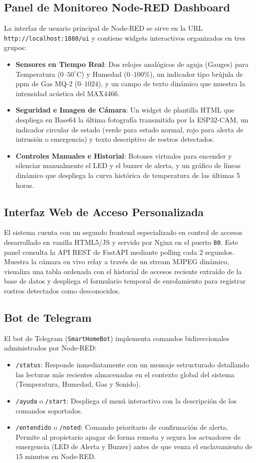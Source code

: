 \documentclass[12pt,letterpaper]{article}
\begin{document}
\subsection{Panel de Monitoreo Node-RED Dashboard}
La interfaz de usuario principal de Node-RED se sirve en la URL \texttt{http://localhost:1880/ui} y contiene widgets interactivos organizados en tres grupos:
\begin{itemize}
    \item \textbf{Sensores en Tiempo Real}: Dos relojes analógicos de aguja (Gauges) para Temperatura ($0\text{--}50^{\circ}\text{C}$) y Humedad ($0\text{--}100\%$), un indicador tipo brújula de ppm de Gas MQ-2 ($0\text{--}1024$), y un campo de texto dinámico que muestra la intensidad acústica del MAX4466.
    \item \textbf{Seguridad e Imagen de Cámara}: Un widget de plantilla HTML que despliega en Base64 la última fotografía transmitida por la ESP32-CAM, un indicador circular de estado (verde para estado normal, rojo para alerta de intrusión o emergencia) y texto descriptivo de rostros detectados.
    \item \textbf{Controles Manuales e Historial}: Botones virtuales para encender y silenciar manualmente el LED y el buzzer de alerta, y un gráfico de líneas dinámico que despliega la curva histórica de temperatura de las últimas 5 horas.
\end{itemize}

\subsection{Interfaz Web de Acceso Personalizada}
El sistema cuenta con un segundo frontend especializado en control de accesos desarrollado en vanilla HTML5/JS y servido por Nginx en el puerto \texttt{80}. Este panel consulta la API REST de FastAPI mediante polling cada 2 segundos. Muestra la cámara en vivo relay a través de un stream MJPEG dinámico, visualiza una tabla ordenada con el historial de accesos reciente extraído de la base de datos y despliega el formulario temporal de enrolamiento para registrar rostros detectados como desconocidos.

\subsection{Bot de Telegram}
El bot de Telegram (\texttt{SmartHomeBot}) implementa comandos bidireccionales administrados por Node-RED:
\begin{itemize}
    \item \texttt{/status}: Responde inmediatamente con un mensaje estructurado detallando las lecturas más recientes almacenadas en el contexto global del sistema (Temperatura, Humedad, Gas y Sonido).
    \item \texttt{/ayuda} o \texttt{/start}: Despliega el menú interactivo con la descripción de los comandos soportados.
    \item \texttt{/entendido} o \texttt{/noted}: Comando prioritario de confirmación de alerta. Permite al propietario apagar de forma remota y segura los actuadores de emergencia (LED de Alerta y Buzzer) antes de que venza el enclavamiento de 15 minutos en Node-RED.
\end{itemize}
\end{document}
